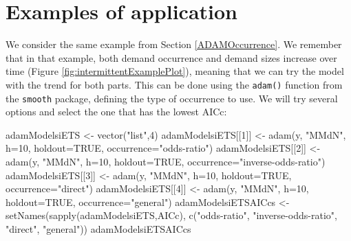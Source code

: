 \documentclass[
]{book}
\newenvironment{Shaded}{\begin{snugshade}}{\end{snugshade}}
\newcommand{\AttributeTok}[1]{\textcolor[rgb]{0.77,0.63,0.00}{#1}}
\newcommand{\ConstantTok}[1]{\textcolor[rgb]{0.00,0.00,0.00}{#1}}
\newcommand{\DecValTok}[1]{\textcolor[rgb]{0.00,0.00,0.81}{#1}}
\newcommand{\FunctionTok}[1]{\textcolor[rgb]{0.00,0.00,0.00}{#1}}
\newcommand{\NormalTok}[1]{#1}
\newcommand{\OtherTok}[1]{\textcolor[rgb]{0.56,0.35,0.01}{#1}}
\newcommand{\StringTok}[1]{\textcolor[rgb]{0.31,0.60,0.02}{#1}}
\theoremstyle{definition}
\theoremstyle{definition}
\theoremstyle{definition}
\theoremstyle{definition}
\theoremstyle{remark}
\begin{document}
\hypertarget{IntermittentExample}{%
\section{Examples of application}\label{IntermittentExample}}

We consider the same example from Section \ref{ADAMOccurrence}. We remember that in that example, both demand occurrence and demand sizes increase over time (Figure \ref{fig:intermittentExamplePlot}), meaning that we can try the model with the trend for both parts. This can be done using the \texttt{adam()} function from the \texttt{smooth} package, defining the type of occurrence to use. We will try several options and select the one that has the lowest AICc:

\begin{Shaded}
\begin{Highlighting}[]
\NormalTok{adamModelsiETS }\OtherTok{\textless{}{-}} \FunctionTok{vector}\NormalTok{(}\StringTok{"list"}\NormalTok{,}\DecValTok{4}\NormalTok{)}
\NormalTok{adamModelsiETS[[}\DecValTok{1}\NormalTok{]] }\OtherTok{\textless{}{-}} \FunctionTok{adam}\NormalTok{(y, }\StringTok{"MMdN"}\NormalTok{, }\AttributeTok{h=}\DecValTok{10}\NormalTok{, }\AttributeTok{holdout=}\ConstantTok{TRUE}\NormalTok{,}
                            \AttributeTok{occurrence=}\StringTok{"odds{-}ratio"}\NormalTok{)}
\NormalTok{adamModelsiETS[[}\DecValTok{2}\NormalTok{]] }\OtherTok{\textless{}{-}} \FunctionTok{adam}\NormalTok{(y, }\StringTok{"MMdN"}\NormalTok{, }\AttributeTok{h=}\DecValTok{10}\NormalTok{, }\AttributeTok{holdout=}\ConstantTok{TRUE}\NormalTok{,}
                            \AttributeTok{occurrence=}\StringTok{"inverse{-}odds{-}ratio"}\NormalTok{)}
\NormalTok{adamModelsiETS[[}\DecValTok{3}\NormalTok{]] }\OtherTok{\textless{}{-}} \FunctionTok{adam}\NormalTok{(y, }\StringTok{"MMdN"}\NormalTok{, }\AttributeTok{h=}\DecValTok{10}\NormalTok{, }\AttributeTok{holdout=}\ConstantTok{TRUE}\NormalTok{,}
                            \AttributeTok{occurrence=}\StringTok{"direct"}\NormalTok{)}
\NormalTok{adamModelsiETS[[}\DecValTok{4}\NormalTok{]] }\OtherTok{\textless{}{-}} \FunctionTok{adam}\NormalTok{(y, }\StringTok{"MMdN"}\NormalTok{, }\AttributeTok{h=}\DecValTok{10}\NormalTok{, }\AttributeTok{holdout=}\ConstantTok{TRUE}\NormalTok{,}
                            \AttributeTok{occurrence=}\StringTok{"general"}\NormalTok{)}
\NormalTok{adamModelsiETSAICcs }\OtherTok{\textless{}{-}}
    \FunctionTok{setNames}\NormalTok{(}\FunctionTok{sapply}\NormalTok{(adamModelsiETS,AICc),}
             \FunctionTok{c}\NormalTok{(}\StringTok{"odds{-}ratio"}\NormalTok{, }\StringTok{"inverse{-}odds{-}ratio"}\NormalTok{,}
               \StringTok{"direct"}\NormalTok{, }\StringTok{"general"}\NormalTok{))}
\NormalTok{adamModelsiETSAICcs}
\end{Highlighting}
\end{Shaded}
\end{document}
